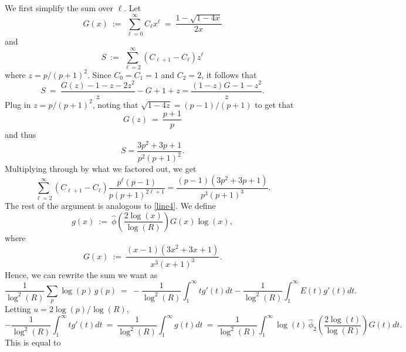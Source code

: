 \documentclass[11pt, reqno]{amsart}
\makeatletter
\renewenvironment{proof}[1][\proofname]{\par
  \vspace{-.7\topsep}%
  \pushQED{\qed}%
  \normalfont
  \topsep0pt \partopsep0pt %
  \trivlist
  \item[\hskip\labelsep
        \itshape
    #1\@addpunct{.}]\ignorespaces
}{%
  \popQED\endtrivlist\@endpefalse
  \addvspace{6pt plus 6pt} %
}
\theoremstyle{definition}
\theoremstyle{remark}
\numberwithin{equation}{section}
\renewcommand{\hat}{\widehat}
\makeatother
\begin{document}
\begin{proof}
    We first simplify the sum over $\ell$. Let
    \begin{equation}
        G(x) \ := \ \sum_{\ell=0}^\infty C_\ell x^\ell \ = \ \frac{1-\sqrt{1-4x}}{2x}
    \end{equation}
    and
    \begin{equation}
        S\ :=\ \sum_{\ell=2}^\infty (C_{\ell+1}-C_\ell)z^\ell
    \end{equation}
    where $z=p/(p+1)^2.$ Since $C_0=C_1=1$ and $C_2=2$, it follows that
    \begin{equation}
        S\ =\ \frac{G(z)-1-z-2z^2}{z}-G+1+z=\frac{(1-z)G-1-z^2}{z}.
    \end{equation}
    Plug in $z=p/(p+1)^2$, noting that $\sqrt{1-4z}=(p-1)/(p+1)$ to get that
    \begin{equation}
        G(z)\ =\ \frac{p+1}{p}
    \end{equation}
    and thus
    \begin{equation}
        S=\frac{3p^2+3p+1}{p^2(p+1)^2}.
    \end{equation}
    Multiplying through by what we factored out, we get
    \begin{equation}
        \sum_{\ell=2}^\infty(C_{\ell+1}-C_\ell) \frac{p^\ell(p-1)}{p(p+1)^{2\ell +1}}=\frac{(p-1)(3p^2+3p+1)}{p^3(p+1)^3}.
    \end{equation}
    The rest of the argument is analogous to \eqref{line4}. We define
    \begin{equation}
        g(x)\ :=\ \hat\phi\left(\frac{2\log(x)}{\log(R)}\right)G(x) \log(x),
    \end{equation}
    where
    \begin{equation}
        G(x)\ :=\ \frac{(x-1)(3x^2+3x+1)}{x^3(x+1)^3}.
    \end{equation}
    Hence, we can rewrite the sum we want as
    \begin{equation}
        \frac{1}{\log^2(R)}\sum_p \log(p)\, g(p)
        \ = \ -\frac{1}{\log^2(R)}\int_1^\infty tg'(t)dt -\frac{1}{\log^2(R)}\int_1^\infty E(t)g'(t)dt.
    \end{equation}
    Letting $u=2\log(p)/\log(R)$,
    \begin{equation}
        -\frac{1}{\log^2(R)}\int_1^\infty tg'(t)dt\ =\ \frac{1}{\log^2(R)}\int_1^\infty g(t)dt
        \ = \ \frac{1}{\log^2(R)}\int_1^\infty 
        \log(t)\,\hat\phi_2\left(\frac{2\log(t)}{\log(R)}\right) G(t) dt.
    \end{equation}
    This is equal to

\end{proof}
\end{document}
